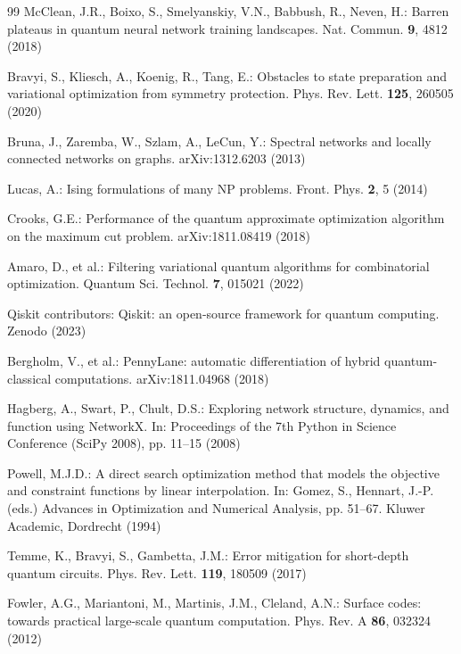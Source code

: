 \documentclass[pdflatex,sn-mathphys-num]{sn-jnl}
\theoremstyle{thmstyleone}
\theoremstyle{thmstyletwo}
\theoremstyle{thmstylethree}
\begin{document}
\begin{thebibliography}{99}
McClean, J.R., Boixo, S., Smelyanskiy, V.N., Babbush, R., Neven, H.: Barren plateaus in quantum neural network training landscapes. Nat. Commun. \textbf{9}, 4812 (2018)

Bravyi, S., Kliesch, A., Koenig, R., Tang, E.: Obstacles to state preparation and variational optimization from symmetry protection. Phys. Rev. Lett. \textbf{125}, 260505 (2020)

Bruna, J., Zaremba, W., Szlam, A., LeCun, Y.: Spectral networks and locally connected networks on graphs. arXiv:1312.6203 (2013)

Lucas, A.: Ising formulations of many NP problems. Front. Phys. \textbf{2}, 5 (2014)

Crooks, G.E.: Performance of the quantum approximate optimization algorithm on the maximum cut problem. arXiv:1811.08419 (2018)

Amaro, D., et al.: Filtering variational quantum algorithms for combinatorial optimization. Quantum Sci. Technol. \textbf{7}, 015021 (2022)

Qiskit contributors: Qiskit: an open-source framework for quantum computing. Zenodo (2023)

Bergholm, V., et al.: PennyLane: automatic differentiation of hybrid quantum-classical computations. arXiv:1811.04968 (2018)

Hagberg, A., Swart, P., Chult, D.S.: Exploring network structure, dynamics, and function using NetworkX. In: Proceedings of the 7th Python in Science Conference (SciPy 2008), pp. 11--15 (2008)

Powell, M.J.D.: A direct search optimization method that models the objective and constraint functions by linear interpolation. In: Gomez, S., Hennart, J.-P. (eds.) Advances in Optimization and Numerical Analysis, pp. 51--67. Kluwer Academic, Dordrecht (1994)

Temme, K., Bravyi, S., Gambetta, J.M.: Error mitigation for short-depth quantum circuits. Phys. Rev. Lett. \textbf{119}, 180509 (2017)

Fowler, A.G., Mariantoni, M., Martinis, J.M., Cleland, A.N.: Surface codes: towards practical large-scale quantum computation. Phys. Rev. A \textbf{86}, 032324 (2012)

\end{thebibliography}
\end{document}
